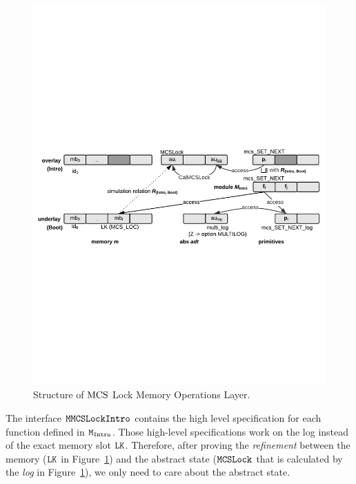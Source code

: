\begin{figure}
\begin{center}
\includegraphics[width=\linewidth]{figs/mcslock/getsetrefinement}
\end{center}
\caption{Structure of $\mathrm{MCS}$ Lock Memory Operations Layer.}
\label{fig:chapter:mcslock:layer-struct-mcs-verification}
\end{figure}

The interface ${\mathrm{\texttt{MMCSLockIntro}}}$ contains the high level specification for each function defined in ${\mathrm{\texttt{M}}}_ {{\mathrm{\texttt{Intro}}}}$. 
Those high-level specifications work on the log instead of the exact memory slot ${\mathrm{\texttt{LK}}}$.
Therefore, after proving the {\em refinement} between the memory (${\mathrm{\texttt{LK}}}$ in Figure~\ref{fig:chapter:mcslock:layer-struct-mcs-verification})
and the abstract state (${\mathrm{\texttt{MCSLock}}}$ that is calculated by the \emph{log}
in Figure~\ref{fig:chapter:mcslock:layer-struct-mcs-verification}), we only need to care about the abstract state.

